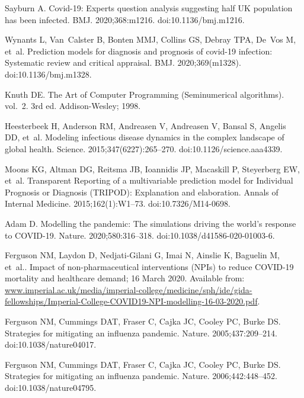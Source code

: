 \documentclass[10pt,letterpaper]{article}
\begin{document}
{\begin{thebibliography}{10}
Sayburn A.
\newblock Covid-19: {Experts} question analysis suggesting half {UK} population
  has been infected.
\newblock BMJ. 2020;368:m1216.
\newblock doi:{10.1136/bmj.m1216}.

Wynants L, Van~Calster B, Bonten MMJ, Collins GS, Debray TPA, De~Vos M, et~al.
\newblock Prediction models for diagnosis and prognosis of covid-19 infection:
  {Systematic} review and critical appraisal.
\newblock BMJ. 2020;369(m1328).
\newblock doi:{10.1136/bmj.m1328}.

Knuth DE.
\newblock The Art of Computer Programming (Seminumerical algorithms). vol.~2.
\newblock 3rd ed. Addison-Wesley; 1998.

Heesterbeek H, Anderson RM, Andreasen V, Andreasen V, Bansal S, Angelis DD,
  et~al.
\newblock Modeling infectious disease dynamics in the complex landscape of
  global health.
\newblock Science. 2015;347(6227):265--270.
\newblock doi:{10.1126/science.aaa4339}.

Moons KG, Altman DG, Reitsma JB, Ioannidis JP, Macaskill P, Steyerberg EW,
  et~al.
\newblock Transparent Reporting of a multivariable prediction model for
  Individual Prognosis or Diagnosis ({TRIPOD}): {Explanation} and elaboration.
\newblock Annals of Internal Medicine. 2015;162(1):W1--73.
\newblock doi:{10.7326/M14-0698}.

Adam D.
\newblock Modelling the pandemic: {The} simulations driving the world's
  response to {COVID}-19.
\newblock Nature. 2020;580:316--318.
\newblock doi:{10.1038/d41586-020-01003-6}.

Ferguson NM, Laydon D, Nedjati-Gilani G, Imai N, Ainslie K, Baguelin M, et~al..
  Impact of non-pharmaceutical interventions ({NPI}s) to reduce {COVID}-19
  mortality and healthcare demand; 16 March 2020.
\newblock Available from:
  \url{www.imperial.ac.uk/media/imperial-college/medicine/sph/ide/gida-fellowships/Imperial-College-COVID19-NPI-modelling-16-03-2020.pdf}.

Ferguson NM, Cummings DAT, Fraser C, Cajka JC, Cooley PC, Burke DS.
\newblock Strategies for mitigating an influenza pandemic.
\newblock Nature. 2005;437:209--214.
\newblock doi:{10.1038/nature04017}.

Ferguson NM, Cummings DAT, Fraser C, Cajka JC, Cooley PC, Burke DS.
\newblock Strategies for mitigating an influenza pandemic.
\newblock Nature. 2006;442:448--452.
\newblock doi:{10.1038/nature04795}.


\end{thebibliography}}
\end{document}
